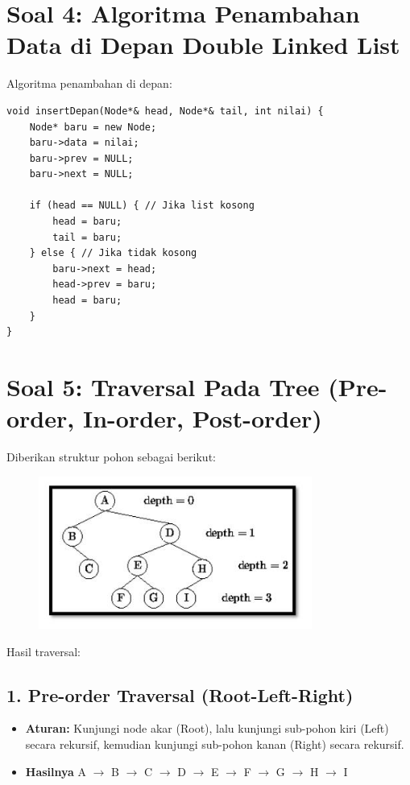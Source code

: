 \documentclass[12pt,a4paper]{article}
\begin{document}
\vspace{1cm}

\section{Soal 4: Algoritma Penambahan Data di Depan Double Linked List}

Algoritma penambahan di depan:

\begin{verbatim}
void insertDepan(Node*& head, Node*& tail, int nilai) {
    Node* baru = new Node;
    baru->data = nilai;
    baru->prev = NULL;
    baru->next = NULL;

    if (head == NULL) { // Jika list kosong
        head = baru;
        tail = baru;
    } else { // Jika tidak kosong
        baru->next = head;
        head->prev = baru;
        head = baru;
    }
}
\end{verbatim}

\vspace{1cm}

\section{Soal 5: Traversal Pada Tree (Pre-order, In-order, Post-order)}

Diberikan struktur pohon sebagai berikut:

\begin{figure}[H]
  \begin{center}
    \includegraphics[width=0.8\textwidth]{images/gambar1.jpg}
  \end{center}
\end{figure}



Hasil traversal:
\subsection*{1. Pre-order Traversal (Root-Left-Right)}
\begin{itemize}
    \item \textbf{Aturan:} Kunjungi node akar (Root), lalu kunjungi sub-pohon kiri (Left) secara rekursif, kemudian kunjungi sub-pohon kanan (Right) secara rekursif.
    \item \textbf{Hasilnya} A $\rightarrow$ B $\rightarrow$ C $\rightarrow$ D $\rightarrow$ E $\rightarrow$ F $\rightarrow$ G $\rightarrow$ H $\rightarrow$ I
\end{itemize}
\end{document}
